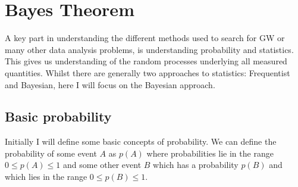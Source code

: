 \section{\label{searchcw:prob} Bayes Theorem}

A key part in understanding the different methods used to search for
\gls{GW} or many other data analysis problems, is understanding probability
and statistics.  This gives us understanding of the random processes
underlying all measured quantities.  Whilst there are generally two approaches
to statistics: Frequentist and Bayesian, here I will focus on the Bayesian
approach.  

\subsection{\label{searchcw:prob:basic}Basic probability}

Initially I will define some basic concepts of probability.  We can define the
probability of some event $A$ as $p(A)$ where probabilities lie in the range $0 \leq p(A)
\leq 1$ and some other event $B$ which has a probability $p(B)$ and
which lies in the range $0 \leq p(B) \leq 1$.

